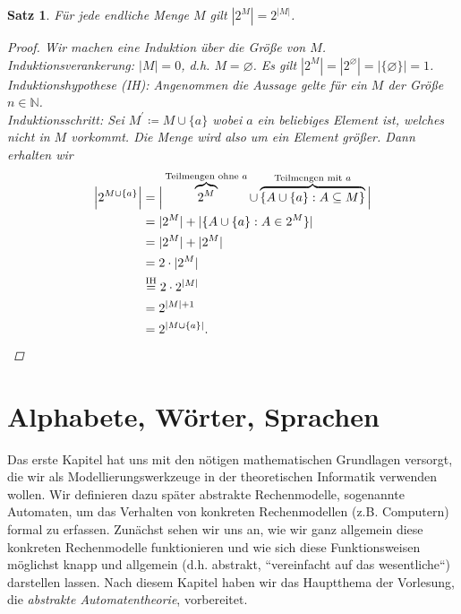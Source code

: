 \documentclass[11pt, a4paper]{article}
\theoremstyle{definition}
\theoremstyle{plain}
\newtheorem{theorem}[definition]{Satz}
\numberwithin{equation}{section}
\let\emptyset\varnothing
\begin{document}
\begin{theorem}
	Für jede endliche Menge $M$ gilt $|2^M| = 2^{|M|}$.
	\begin{proof}
		Wir machen eine Induktion über die Größe von $M$.\\
		Induktionsverankerung: $|M| = 0$, d.h. $M = \emptyset$. Es gilt $|2^M| = |2^\emptyset| = |\{\emptyset\}| = 1$. \checkmark\\
		Induktionshypothese (IH): Angenommen die Aussage gelte für ein $M$ der Größe $n \in \mathbb{N}$.\\
		Induktionsschritt: Sei $M^\prime \coloneqq M \cup \{a\}$ wobei $a$ ein beliebiges Element ist, welches nicht in $M$ vorkommt. Die Menge wird also um ein Element größer. Dann erhalten wir
		\begin{align*}
			\Big| 2^{M \cup \{a\}} \Big| &= \Big| \overbrace{2^M}^{\text{Teilmengen ohne } a} \cup \overbrace{\{A \cup \{a\} : A \subseteq M \}}^{\text{Teilmengen mit } a} \Big|\\
			&= |2^M| + |\{A \cup \{a\} : A \in 2^M \}|\\
			&= |2^M| + |2^M|\\
			&= 2 \cdot |2^M|\\
			&\overset{\text{IH}}{=} 2\cdot 2^{|M|}\\
			&= 2^{|M|+1}\\
			&= 2^{|M \cup \{a\}|}. \qedhere
		\end{align*}
	\end{proof}
\end{theorem}



\newpage
\section{Alphabete, Wörter, Sprachen}\label{sec:awl}
Das erste Kapitel hat uns mit den nötigen mathematischen Grundlagen versorgt, die wir als Modellierungswerkzeuge in der theoretischen Informatik verwenden wollen. Wir definieren dazu später abstrakte Rechenmodelle, sogenannte Automaten, um das Verhalten von konkreten Rechenmodellen (z.B. Computern) formal zu erfassen. Zunächst sehen wir uns an, wie wir ganz allgemein diese konkreten Rechenmodelle funktionieren und wie sich diese Funktionsweisen möglichst knapp und allgemein (d.h. abstrakt, ``vereinfacht auf das wesentliche``) darstellen lassen. Nach diesem Kapitel haben wir das Hauptthema der Vorlesung, die \textit{abstrakte Automatentheorie}, vorbereitet.
\end{document}
